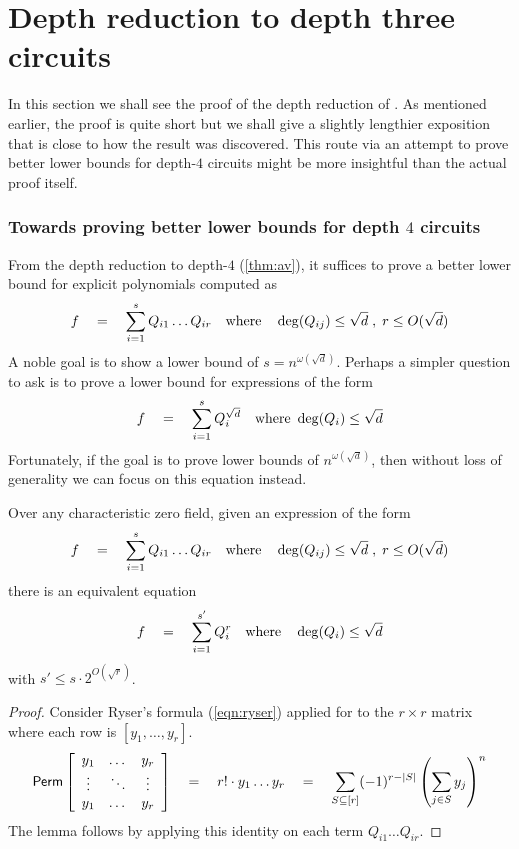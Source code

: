 \section{Depth reduction to depth three circuits}\label{sec:depth-3-red}

In this section we shall see the proof of the depth reduction of
\cite{gkks13b}.
As mentioned earlier, the proof is quite short but we shall give a
slightly lengthier exposition that is close to how the result was
discovered.
This route via an attempt to prove better lower bounds for depth-$4$
circuits might be more insightful than the actual proof itself. 

\subsubsection{Towards proving better lower bounds for depth $4$ circuits}

From the depth reduction to depth-$4$ (\autoref{thm:av}), it suffices to
prove a better lower bound for explicit polynomials computed as
\begin{equation}\label{eqn:d4-LB}
f\quad = \quad \sum_{i=1}^s Q_{i1}\dots Q_{ir} \quad\text{where}\quad \deg(Q_{ij})\leq \sqrt{d}\;,\; r\leq O(\sqrt{d})
\end{equation}
A noble goal is to show a lower bound of $s = n^{\omega(\sqrt{d})}$.
Perhaps a simpler question to ask is to prove a lower bound for
expressions of the form
\begin{equation}\label{eqn:d4pow-LB}
f\quad = \quad \sum_{i=1}^s Q_{i}^{\sqrt{d}} \quad\text{where }\deg(Q_i)\leq \sqrt{d}
\end{equation}
Fortunately, if the goal is to prove lower bounds of
$n^{\omega(\sqrt{d})}$, then without loss of generality we can focus
on this equation instead.

\begin{lemma}\label{lem:fischer}
  Over any characteristic zero field, given an expression of the form
  \[
  f\quad = \quad \sum_{i=1}^s Q_{i1}\dots Q_{ir} \quad\text{where}\quad \deg(Q_{ij})\leq \sqrt{d}\;,\; r\leq O(\sqrt{d})
  \]
  there is an equivalent equation
  \[
  f\quad = \quad \sum_{i=1}^{s'} Q_{i}^r\quad\text{where}\quad \deg(Q_{i})\leq \sqrt{d}
  \]
  with $s' \leq s \cdot 2^{O(\sqrt{r})}$. 
\end{lemma}
\begin{proof}
  Consider Ryser's formula (\ref{eqn:ryser}) applied for to the
  $r\times r$ matrix where each row is $[y_1,\dots, y_r]$. 
  \[
  \operatorname{\mathsf{Perm}} \left[\begin{array}{ccc} y_1 & \dots & y_r\\ \vdots & \ddots & \vdots \\ y_1 & \dots & y_r\end{array}\right] \quad = \quad r! \cdot y_1\dots y_r \quad = \quad \sum_{S\subseteq [r]} (-1)^{r- |S|} \left(\sum_{j\in S} y_j\right)^n
  \]
  The lemma follows by applying this identity on each term
  $Q_{i1}\dots Q_{ir}$. 
\end{proof}

